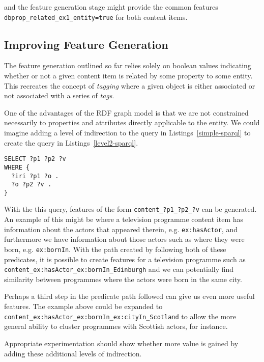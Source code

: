 \documentclass[10pt,a4paper]{report}
\begin{document}
\noident and the feature generation stage might provide the common features
\texttt{dbprop_related_ex1_entity=true} for both content items.

\subsection{Improving Feature Generation}

The feature generation outlined so far relies solely on boolean values
indicating whether or not a given content item is related by some property to
some entity. This recreates the concept of \emph{tagging} where a given
object is either associated or not associated with a series of \emph{tags}.

One of the advantages of the RDF graph model is that we are not constrained
necessarily to properties and attributes directly applicable to the entity. We
could imagine adding a level of indirection to the query in
Listings~\ref{simple-sparql} to create the query in
Listings~\ref{level2-sparql}.


\begin{lstlisting}[label=lst:level2-sparql,caption={Generates field \texttt{content\_?p1\_?p2\_?v} with value \texttt{true}},language=sparql]
SELECT ?p1 ?p2 ?v
WHERE {
  ?iri ?p1 ?o .
  ?o ?p2 ?v .
}
\end{lstlisting}

With the this query, features of the form \texttt{content\_?p1\_?p2\_?v} can
be generated. An example of this might be where a television programme
content item has information about the actors that appeared therein, e.g.
\texttt{ex:hasActor}, and furthermore we have information about those actors
such as where they were born, e.g. \texttt{ex:bornIn}. With the path created
by following both of these predicates, it is possible to create features for
a television programme such as
\texttt{content\_ex:hasActor\_ex:bornIn\_Edinburgh} and we can potentially
find similarity between programmes where the actors were born in the same
city.

Perhaps a third step in the predicate path followed can give us even more
useful features. The example above could be expanded to
\texttt{content\_ex:hasActor\_ex:bornIn\_ex:cityIn\_Scotland} to allow the
more general ability to cluster programmes with Scottish actors, for instance.

Appropriate experimentation should show whether more value is gained by
adding these additional levels of indirection.
\end{document}
